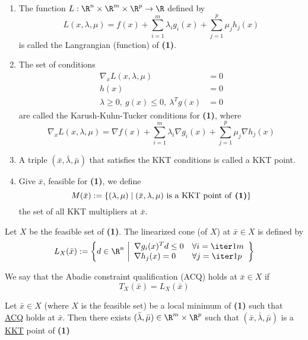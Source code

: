 \begin{enumerate}
	\item The function $L:\R^n\times\R^m\times\R^p\to\R$ defined by
	      $$
		      L(x,\lambda,\mu)=f(x)+\sum_{i=1}^m\lambda_ig_i(x)+\sum_{j=1}^p\mu_jh_j(x)
	      $$
	      is called the Langrangian (function) of \textbf{(1)}.
	\item The set of conditions
	      \begin{align}
		      \nabla_xL(x,\lambda,\mu)                 & = 0 \\
		      h(x)                                     & = 0 \\
		      \lambda\geq0,\ g(x)\leq0,\ \lambda^Tg(x) & =0
	      \end{align}
	      are called the Karush-Kuhn-Tucker conditions for \textbf{(1)},
	      where
	      $$\nabla_xL(x,\lambda,\mu)=\nabla f(x)+\sum_{i=1}^m\lambda_i\nabla g_i(x)+\sum_{j=1}^p\mu_j\nabla h_j(x)$$
	\item A triple $(\bar x,\bar\lambda,\bar\mu)$ that satisfies the
	      KKT conditions is called a KKT point.
	\item Give $\bar x$, feasible for \textbf{(1)}, we define
	      $$
		      M(\bar x):=\{(\lambda,\mu)\mid(\bar x,\lambda,\mu)\text{ is a KKT point of \textbf{(1)}} \}
	      $$
	      the set of all KKT multipliers at $\bar x$.
\end{enumerate}

\label{ca4f471}

Let $X$ be the feasible set of \textbf{(1)}. The linearized cone (of
$X$) at $\bar x\in X$ is defined by
$$
	L_X(\bar x):=\left\{ d\in\R^n\ \middle\vert
	\begin{array}{l l}
		\nabla g_i(x)^Td\leq0 & \forall i=\iter1m \\
		\nabla h_j(x)=0       & \forall j=\iter1p
	\end{array}
	\right\}
$$

\label{adc266e}

We say that the Abadie constraint qualification (ACQ) holds at $\bar
	x\in X$ if
$$
	T_X(\bar x)=L_X(\bar x)
$$

\label{b1c5437}

Let $\bar x\in X$ (where $X$ is the feasible set) be a local minimum
of \textbf{(1)} such that \href{adc266e}{ACQ} holds at $\bar x$. Then
there exists $(\bar\lambda,\bar\mu)\in\R^m\times\R^p$ such that $(\bar
	x,\bar\lambda,\bar\mu)$ is a \href{b38093d}{KKT} point of
\textbf{(1)}

